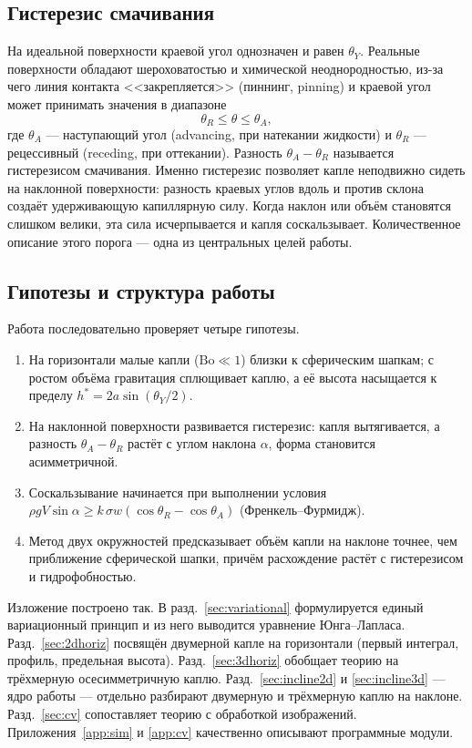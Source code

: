 \documentclass[11pt]{article}
\newcommand{\Bo}{\mathrm{Bo}}
\newcommand{\thA}{\theta_{A}}
\newcommand{\thR}{\theta_{R}}
\newcommand{\thY}{\theta_{Y}}
\theoremstyle{definition}
\begin{document}
\subsection{Гистерезис смачивания}
На идеальной поверхности краевой угол однозначен и равен $\thY$. Реальные
поверхности обладают шероховатостью и химической неоднородностью, из-за чего линия
контакта <<закрепляется>> (пиннинг, pinning) и краевой угол может принимать
значения в диапазоне
\begin{equation}
\thR\le\theta\le\thA ,
\end{equation}
где $\thA$ --- наступающий угол (advancing, при натекании жидкости) и $\thR$ ---
рецессивный (receding, при оттекании). Разность $\thA-\thR$ называется гистерезисом
смачивания. Именно гистерезис позволяет капле неподвижно сидеть на наклонной
поверхности: разность краевых углов вдоль и против склона создаёт удерживающую
капиллярную силу. Когда наклон или объём становятся слишком велики, эта сила
исчерпывается и капля соскальзывает. Количественное описание этого порога ---
одна из центральных целей работы.

\subsection{Гипотезы и структура работы}
Работа последовательно проверяет четыре гипотезы.
\begin{enumerate}[topsep=2pt,itemsep=1pt]
\item На горизонтали малые капли ($\Bo\ll 1$) близки к сферическим шапкам; с ростом
объёма гравитация сплющивает каплю, а её высота насыщается к пределу
$h^{*}=2a\sin(\thY/2)$.
\item На наклонной поверхности развивается гистерезис: капля вытягивается, а
разность $\thA-\thR$ растёт с углом наклона $\alpha$, форма становится
асимметричной.
\item Соскальзывание начинается при выполнении условия
$\rho g V\sin\alpha\ge k\,\sigma w(\cos\thR-\cos\thA)$ (Френкель--Фурмидж).
\item Метод двух окружностей предсказывает объём капли на наклоне точнее, чем
приближение сферической шапки, причём расхождение растёт с гистерезисом и
гидрофобностью.
\end{enumerate}

Изложение построено так. В разд.~\ref{sec:variational} формулируется единый
вариационный принцип и из него выводится уравнение Юнга--Лапласа.
Разд.~\ref{sec:2dhoriz} посвящён двумерной капле на горизонтали (первый интеграл,
профиль, предельная высота). Разд.~\ref{sec:3dhoriz} обобщает теорию на
трёхмерную осесимметричную каплю. Разд.~\ref{sec:incline2d} и
\ref{sec:incline3d} --- ядро работы --- отдельно разбирают двумерную и трёхмерную
каплю на наклоне. Разд.~\ref{sec:cv} сопоставляет теорию с обработкой изображений.
Приложения~\ref{app:sim} и \ref{app:cv} качественно описывают программные модули.
\end{document}
